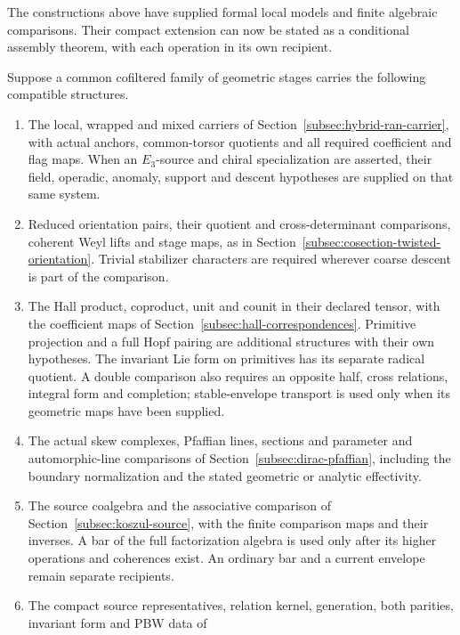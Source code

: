 The constructions above have supplied formal local models and
finite algebraic comparisons. Their compact extension can now be
stated as a conditional assembly theorem, with each operation in
its own recipient.

\begin{theorem}
\label{thm:ch5-construction-of-dirac-igusa-pro-object}
Suppose a common cofiltered family of geometric stages carries
the following compatible structures.
\begin{enumerate}
\item[\textup{(L1)}] The local, wrapped and mixed carriers of
Section~\ref{subsec:hybrid-ran-carrier}, with actual anchors,
common-torsor quotients and all required coefficient and flag maps.
When an \(E_3\)-source and chiral specialization are asserted,
their field, operadic, anomaly, support and descent hypotheses
are supplied on that same system.
\item[\textup{(L2)}] Reduced orientation pairs, their quotient
and cross-determinant comparisons, coherent Weyl lifts and stage
maps, as in Section~\ref{subsec:cosection-twisted-orientation}.
Trivial stabilizer characters are required wherever coarse
descent is part of the comparison.
\item[\textup{(L3)}] The Hall product, coproduct, unit and counit
in their declared tensor, with the coefficient maps of
Section~\ref{subsec:hall-correspondences}. Primitive projection
and a full Hopf pairing are additional structures with their own
hypotheses. The invariant Lie form on primitives has its separate
radical quotient. A double comparison also requires an opposite
half, cross relations, integral form and completion; stable-envelope
transport is used only when its geometric maps have been supplied.
\item[\textup{(L4)}] The actual skew complexes, Pfaffian lines,
sections and parameter and automorphic-line comparisons of
Section~\ref{subsec:dirac-pfaffian}, including the boundary
normalization and the stated geometric or analytic effectivity.
\item[\textup{(L5)}] The source coalgebra and the associative
comparison of Section~\ref{subsec:koszul-source}, with the
finite comparison maps and their inverses. A bar of the full
factorization algebra is used only after its higher operations
and coherences exist. An ordinary bar and a current envelope
remain separate recipients.
\item[\textup{(L6)}] The compact source representatives, relation
kernel, generation, both parities, invariant form and PBW data of

\end{enumerate}
\end{theorem}
